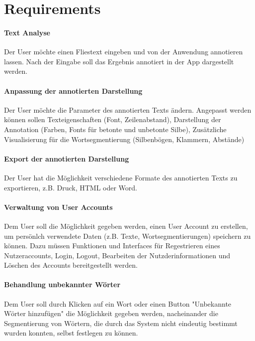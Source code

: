 \section{Requirements}

\paragraph{Text Analyse} 
Der User möchte einen Fliestext eingeben und von der Anwendung annotieren lassen. Nach der Eingabe soll das Ergebnis annotiert in der App dargestellt werden.

\paragraph{Anpassung der annotierten Darstellung}
Der User möchte die Parameter des annotierten Texts ändern. Angepasst werden können sollen Texteigenschaften (Font, Zeilenabstand), Darstellung der Annotation (Farben, Fonts für betonte und unbetonte Silbe), Zusätzliche Visualisierung für die Wortsegmentierung (Silbenbögen, Klammern, Abstände)

\paragraph{Export der annotierten Darstellung}
Der User hat die Möglichkeit verschiedene Formate des annotierten Texts zu exportieren, z.B. Druck, HTML oder Word.

\paragraph{Verwaltung von User Accounts}
Dem User soll die Möglichkeit gegeben werden, einen User Account zu erstellen, um persönlch verwendete Daten (z.B. Texte, Wortsegmentierungen) speichern zu können. Dazu müssen Funktionen und Interfaces für Regestrieren eines Nutzeraccounts, Login, Logout, Bearbeiten der Nutzderinformationen und Löschen des Accounts bereitgestellt werden.

\paragraph{Behandlung unbekannter Wörter}
Dem User soll durch Klicken auf ein Wort oder einen Button "Unbekannte Wörter hinzufügen" die Möglichkeit gegeben werden, nacheinander die Segmentierung von Wörtern, die durch das System nicht eindeutig bestimmt wurden konnten, selbst festlegen zu können.

